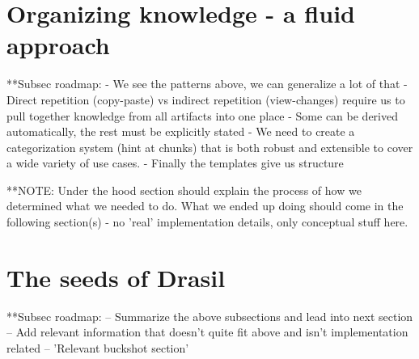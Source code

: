 
\section{Organizing knowledge - a fluid approach}
  **Subsec roadmap:
    - We see the patterns above, we can generalize a lot of that
    - Direct repetition (copy-paste) vs indirect repetition (view-changes)
    require us to pull together knowledge from all artifacts into one place
    - Some can be derived automatically, the rest must be explicitly stated
    - We need to create a categorization system (hint at chunks) that is both
    robust and extensible to cover a wide variety of use cases.
    - Finally the templates give us structure

  **NOTE: Under the hood section should explain the process of how we determined
  what we needed to do. What we ended up doing should come in the following
  section(s) - no 'real' implementation details, only conceptual stuff here.
  
\section{The seeds of Drasil}
  **Subsec roadmap:
    -- Summarize the above subsections and lead into next section
    -- Add relevant information that doesn't quite fit above 
      and isn't implementation related
    -- 'Relevant buckshot section'